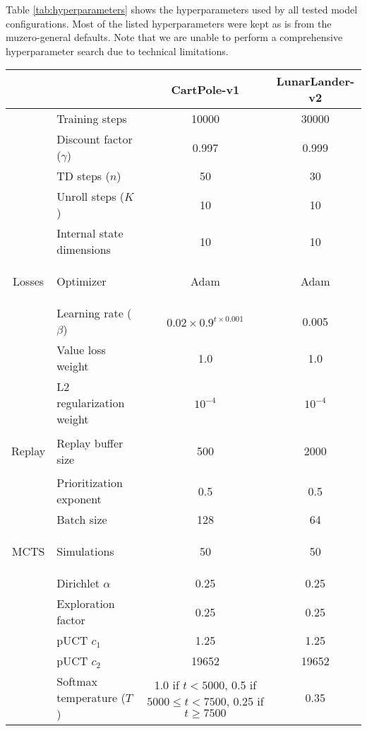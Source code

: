 Table \ref{tab:hyperparameters} shows the hyperparameters used by all tested model configurations. Most of the listed hyperparameters were kept as is from the muzero-general defaults. Note that we are unable to perform a comprehensive hyperparameter search due to technical limitations.
\begin{table}[ht]
    \centering
    \begin{tabular}{|c|l||c|c|}
        \hline
        & & CartPole-v1 & LunarLander-v2 \\
        \hline\hline

        & Training steps & 10000 & 30000 \\
        \cline{2-4}
        & Discount factor ($\gamma$) & 0.997 & 0.999 \\
        \cline{2-4}
        & TD steps ($n$) & 50 & 30 \\
        \cline{2-4}
        & Unroll steps ($K$) & 10 & 10 \\
        \cline{2-4}
        & Internal state dimensions & 10 & 10 \\

        \hline

        \multirow{4.1}{*}{\begin{sideways}Losses\end{sideways}} & Optimizer & Adam & Adam \\
        \cline{2-4}
        & Learning rate ($\beta$) & $0.02 \times 0.9^{t \times 0.001}$ & 0.005 \\
        \cline{2-4}
        & Value loss weight & 1.0 & 1.0 \\
        \cline{2-4}
        & L2 regularization weight & $10^{-4}$ & $10^{-4}$ \\

        \hline

        \multirow{3.2}{*}{\begin{sideways}Replay\end{sideways}} & Replay buffer size & 500 & 2000 \\
        \cline{2-4}
        & Prioritization exponent & 0.5 & 0.5 \\
        \cline{2-4}
        & Batch size & 128 & 64 \\

        \hline

        \multirow{7.5}{*}{\begin{sideways}MCTS\end{sideways}} & Simulations & 50 & 50 \\
        \cline{2-4}
        & Dirichlet $\alpha$ & 0.25 & 0.25 \\
        \cline{2-4}
        & Exploration factor & 0.25 & 0.25 \\
        \cline{2-4}
        & pUCT $c_1$ & 1.25 & 1.25 \\
        \cline{2-4}
        & pUCT $c_2$ & 19652 & 19652 \\
        \cline{2-4}
        & Softmax temperature ($T$) & \makecell{
            1.0 if $t<5000$, \\ 0.5 if $5000 \leq t < 7500$, \\ 0.25 if $t \geq 7500$
        } & 0.35 \\


\end{tabular}
\end{table}

